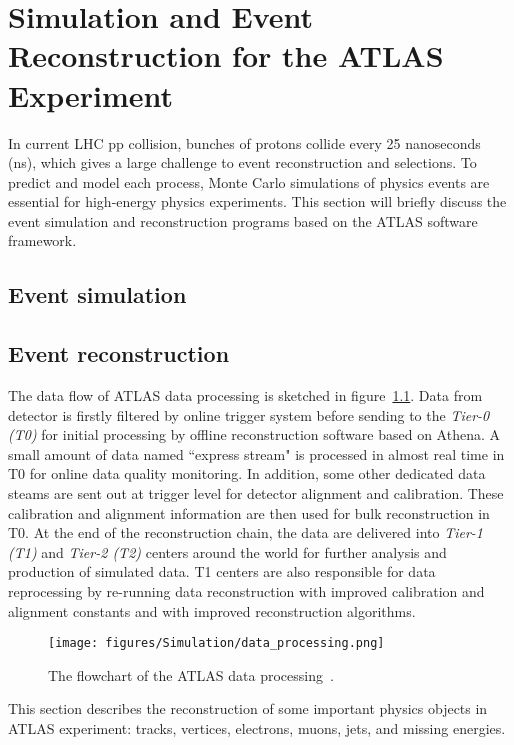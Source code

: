 \chapter{Simulation and Event Reconstruction for the ATLAS Experiment}

In current LHC pp collision, bunches of protons collide every 25 nanoseconds (ns), which gives a large challenge to event reconstruction and selections.
To predict and model each process, Monte Carlo simulations of physics events are essential for high-energy physics experiments.
This section will briefly discuss the event simulation and reconstruction programs based on the ATLAS software framework. 

\section{Event simulation}
\label{sec:simulation_framework}


\section{Event reconstruction}
\label{sec:reconstruction}

The data flow of ATLAS data processing is sketched in figure~\ref{fig:data_processing}. 
Data from detector is firstly filtered by online trigger system before sending to the \textit{Tier-0 (T0)} for initial processing by offline reconstruction software based on Athena.
A small amount of data named ``express stream" is processed in almost real time in T0 for online data quality monitoring.
In addition, some other dedicated data steams are sent out at trigger level for detector alignment and calibration.
These calibration and alignment information are then used for bulk reconstruction in T0.
At the end of the reconstruction chain, the data are delivered into \textit{Tier-1 (T1)} and \textit{Tier-2 (T2)} centers around the world for further analysis and production of simulated data.
T1 centers are also responsible for data reprocessing by re-running data reconstruction with improved calibration and alignment constants and with improved reconstruction algorithms.
\begin{figure}[!htb]
  \centering
  \texttt{[image: figures/Simulation/data\_processing.png]}
  \caption{The flowchart of the ATLAS data processing~\cite{Boyd_2010}.}
  \label{fig:data_processing}
\end{figure}

This section describes the reconstruction of some important physics objects in ATLAS experiment: tracks, vertices, electrons, muons, jets, and missing energies.








